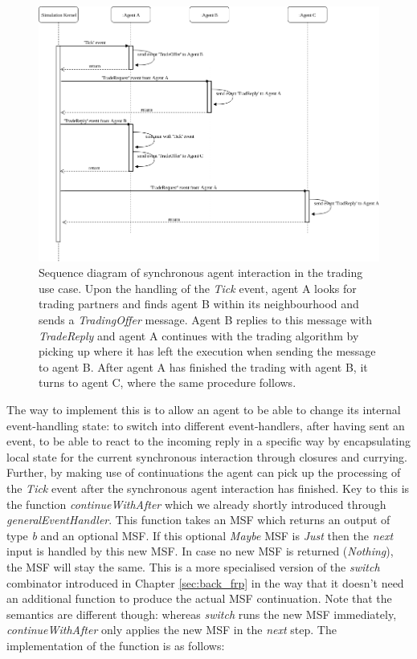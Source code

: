 \begin{figure}
	\centering
	\includegraphics[width=1.0\textwidth, angle=0]{./fig/eventdriven/syncagentinteractions.png}
	\caption{Sequence diagram of synchronous agent interaction in the trading use case. Upon the handling of the \textit{Tick} event, agent A looks for trading partners and finds agent B within its neighbourhood and sends a \textit{TradingOffer} message. Agent B replies to this message with \textit{TradeReply} and agent A continues with the trading algorithm by picking up where it has left the execution when sending the message to agent B. After agent A has finished the trading with agent B, it turns to agent C, where the same procedure follows.}
	\label{fig:syncagentinteractions}
\end{figure}

The way to implement this is to allow an agent to be able to change its internal event-handling state: to switch into different event-handlers, after having sent an event, to be able to react to the incoming reply in a specific way by encapsulating local state for the current synchronous interaction through closures and currying. Further, by making use of continuations the agent can pick up the processing of the \textit{Tick} event after the synchronous agent interaction has finished. Key to this is the function \textit{continueWithAfter} which we already shortly introduced through \textit{generalEventHandler}. This function takes an MSF which returns an output of type \textit{b} and an optional MSF. If this optional \textit{Maybe} MSF is \textit{Just} then the \textit{next} input is handled by this new MSF. In case no new MSF is returned (\textit{Nothing}), the MSF will stay the same. This is a more specialised version of the \textit{switch} combinator introduced in Chapter \ref{sec:back_frp} in the way that it doesn't need an additional function to produce the actual MSF continuation. Note that the semantics are different though: whereas \textit{switch} runs the new MSF immediately, \textit{continueWithAfter} only applies the new MSF in the \textit{next} step. The implementation of the function is as follows:

